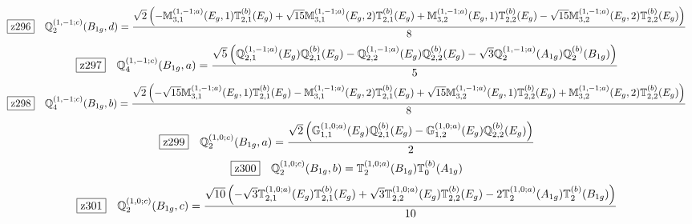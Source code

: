 \documentclass[fleqn,10pt,landscape]{jsarticle}
\begin{document}
\begin{dmath*}
\hspace*{3mm}\fbox{z296}\quad \mathbb{Q}_{2}^{(1,-1;c)}(B_{1g},d)=\frac{\sqrt{2} \left(- \mathbb{M}_{3,1}^{(1,-1;a)}(E_{g},1) \mathbb{T}_{2,1}^{(b)}(E_{g}) + \sqrt{15} \mathbb{M}_{3,1}^{(1,-1;a)}(E_{g},2) \mathbb{T}_{2,1}^{(b)}(E_{g}) + \mathbb{M}_{3,2}^{(1,-1;a)}(E_{g},1) \mathbb{T}_{2,2}^{(b)}(E_{g}) - \sqrt{15} \mathbb{M}_{3,2}^{(1,-1;a)}(E_{g},2) \mathbb{T}_{2,2}^{(b)}(E_{g})\right)}{8}
\end{dmath*}
\begin{dmath*}
\hspace*{3mm}\fbox{z297}\quad \mathbb{Q}_{4}^{(1,-1;c)}(B_{1g},a)=\frac{\sqrt{5} \left(\mathbb{Q}_{2,1}^{(1,-1;a)}(E_{g}) \mathbb{Q}_{2,1}^{(b)}(E_{g}) - \mathbb{Q}_{2,2}^{(1,-1;a)}(E_{g}) \mathbb{Q}_{2,2}^{(b)}(E_{g}) - \sqrt{3} \mathbb{Q}_{2}^{(1,-1;a)}(A_{1g}) \mathbb{Q}_{2}^{(b)}(B_{1g})\right)}{5}
\end{dmath*}
\begin{dmath*}
\hspace*{3mm}\fbox{z298}\quad \mathbb{Q}_{4}^{(1,-1;c)}(B_{1g},b)=\frac{\sqrt{2} \left(- \sqrt{15} \mathbb{M}_{3,1}^{(1,-1;a)}(E_{g},1) \mathbb{T}_{2,1}^{(b)}(E_{g}) - \mathbb{M}_{3,1}^{(1,-1;a)}(E_{g},2) \mathbb{T}_{2,1}^{(b)}(E_{g}) + \sqrt{15} \mathbb{M}_{3,2}^{(1,-1;a)}(E_{g},1) \mathbb{T}_{2,2}^{(b)}(E_{g}) + \mathbb{M}_{3,2}^{(1,-1;a)}(E_{g},2) \mathbb{T}_{2,2}^{(b)}(E_{g})\right)}{8}
\end{dmath*}
\begin{dmath*}
\hspace*{3mm}\fbox{z299}\quad \mathbb{Q}_{2}^{(1,0;c)}(B_{1g},a)=\frac{\sqrt{2} \left(\mathbb{G}_{1,1}^{(1,0;a)}(E_{g}) \mathbb{Q}_{2,1}^{(b)}(E_{g}) - \mathbb{G}_{1,2}^{(1,0;a)}(E_{g}) \mathbb{Q}_{2,2}^{(b)}(E_{g})\right)}{2}
\end{dmath*}
\begin{dmath*}
\hspace*{3mm}\fbox{z300}\quad \mathbb{Q}_{2}^{(1,0;c)}(B_{1g},b)=\mathbb{T}_{2}^{(1,0;a)}(B_{1g}) \mathbb{T}_{0}^{(b)}(A_{1g})
\end{dmath*}
\begin{dmath*}
\hspace*{3mm}\fbox{z301}\quad \mathbb{Q}_{2}^{(1,0;c)}(B_{1g},c)=\frac{\sqrt{10} \left(- \sqrt{3} \mathbb{T}_{2,1}^{(1,0;a)}(E_{g}) \mathbb{T}_{2,1}^{(b)}(E_{g}) + \sqrt{3} \mathbb{T}_{2,2}^{(1,0;a)}(E_{g}) \mathbb{T}_{2,2}^{(b)}(E_{g}) - 2 \mathbb{T}_{2}^{(1,0;a)}(A_{1g}) \mathbb{T}_{2}^{(b)}(B_{1g})\right)}{10}
\end{dmath*}
\end{document}
